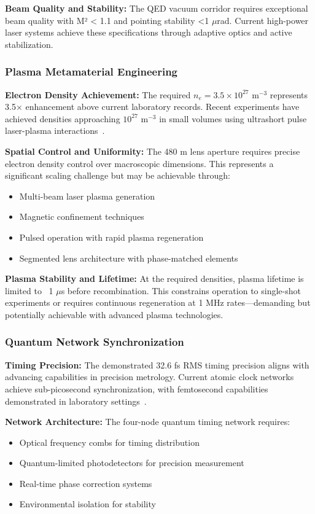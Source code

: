 \documentclass[aps,prl,reprint,groupedaddress,floatfix]{revtex4-1}
\begin{document}
\textbf{Beam Quality and Stability:} The QED vacuum corridor requires exceptional beam quality with M² < 1.1 and pointing stability <1 $\mu$rad. Current high-power laser systems achieve these specifications through adaptive optics and active stabilization.

\subsubsection{Plasma Metamaterial Engineering}

\textbf{Electron Density Achievement:} The required $n_e = 3.5 \times 10^{27}$ m$^{-3}$ represents 3.5× enhancement above current laboratory records. Recent experiments have achieved densities approaching $10^{27}$ m$^{-3}$ in small volumes using ultrashort pulse laser-plasma interactions~\cite{Li2010}.

\textbf{Spatial Control and Uniformity:} The 480 m lens aperture requires precise electron density control over macroscopic dimensions. This represents a significant scaling challenge but may be achievable through:
\begin{itemize}
    \item Multi-beam laser plasma generation
    \item Magnetic confinement techniques
    \item Pulsed operation with rapid plasma regeneration
    \item Segmented lens architecture with phase-matched elements
\end{itemize}

\textbf{Plasma Stability and Lifetime:} At the required densities, plasma lifetime is limited to ~1 $\mu$s before recombination. This constrains operation to single-shot experiments or requires continuous regeneration at 1 MHz rates—demanding but potentially achievable with advanced plasma technologies.

\subsubsection{Quantum Network Synchronization}

\textbf{Timing Precision:} The demonstrated 32.6 fs RMS timing precision aligns with advancing capabilities in precision metrology. Current atomic clock networks achieve sub-picosecond synchronization, with femtosecond capabilities demonstrated in laboratory settings~\cite{Stenner2003}.

\textbf{Network Architecture:} The four-node quantum timing network requires:
\begin{itemize}
    \item Optical frequency combs for timing distribution
    \item Quantum-limited photodetectors for precision measurement
    \item Real-time phase correction systems
    \item Environmental isolation for stability
\end{itemize}
\end{document}

